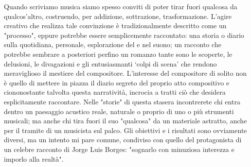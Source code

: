 \documentclass[9pt, twoside, a5paper]{extreport}
\begin{document}
{\fontsize{8}{8}\selectfont Quando scriviamo musica siamo spesso conviti di poter tirar fuori qualcosa da qualcos'altro, costruendo, per addizione, sottrazione, trasformazione. L'agire creativo che realizza tale convinzione è tradizionalmente descritto come un "processo", eppure potrebbe essere semplicemente raccontato: una storia o diario sulla quotidiana, personale, esplorazione del e nel suono; un racconto che potrebbe sembrare a posteriori perfino un romanzo tante sono le scoperte, le delusioni, le divagazioni e gli entusiasmanti `colpi di scena' che rendono meraviglioso il mestiere del compositore. L'interesse del compositore di solito non è quello di mettere in piazza il diario segreto del proprio atto compositivo e ciononostante talvolta questa narratività, incrocia a tratti ciò che desidera esplicitamente raccontare. Nelle "storie" di questa stasera incontrerete chi entra dentro un paesaggio acustico reale, naturale o proprio di uno o più strumenti musicali; ma anche chi tira fuori il suo "qualcosa" da un materiale astratto, anche per il tramite di un musicista sul palco. Gli obiettivi e i risultati sono ovviamente diversi, ma un intento mi pare comune, condiviso con quello del protagonista di un celebre racconto di Jorge Luis Borges: "sognarlo con minuziosa interezza e imporlo alla realtà".}

\end{document}
